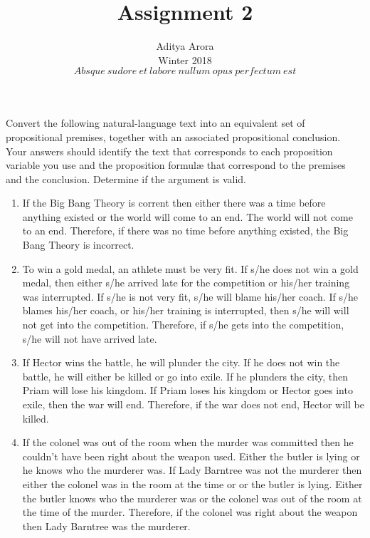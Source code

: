 \documentclass[12pt]{article}
\newenvironment{problem}[2][Problem]{\begin{trivlist}
\item[\hskip \labelsep {\bfseries #1}\hskip \labelsep {\bfseries #2.}]}{\end{trivlist}}
\begin{document}

\title{Assignment 2}%
\author{Aditya Arora\\ %
Winter 2018\\$Absque\ sudore\ et\ labore\ nullum\ opus\ perfectum\ est$} %
\maketitle

\begin{problem}{1}
Convert the following natural-language text into an equivalent set of propositional premises, together with an associated propositional conclusion.  Your answers should identify the text that corresponds to each proposition variable you use and the proposition formul{\ae} that correspond to the premises and the conclusion.  Determine if the argument is valid.
\begin{enumerate}
  \parskip=0in
  \parsep=0in
  \itemsep=0in
\item If the Big Bang Theory is corrent then either there was a time before anything existed or the world will come to an end.  The world will not come to an end.  Therefore, if there was no time before anything existed, the Big Bang Theory is incorrect.
\item To win a gold medal, an athlete must be very fit.  If s/he does not win a gold medal, then either s/he arrived late for the competition or his/her training was interrupted.  If s/he is not very fit, s/he will blame his/her coach.  If s/he blames his/her coach, or his/her training is interrupted, then s/he will will not get into the competition.  Therefore, if s/he gets into the competition, s/he will not have arrived late.
\item If Hector wins the battle, he will plunder the city.  If he does not win the battle, he will either be killed or go into exile.  If he plunders the city, then Priam will lose his kingdom.  If Priam loses his kingdom or Hector goes into exile, then the war will end.  Therefore, if the war does not end, Hector will be killed.
\item If the colonel was out of the room when the murder was committed then he couldn't have been right about the weapon used.  Either the butler is lying or he knows who the murderer was.  If Lady Barntree was not the murderer then either the colonel was in the room at the time or or the butler is lying.  Either the butler knows who the murderer was or the colonel was out of the room at the time of the murder.  Therefore, if the colonel was right about the weapon then Lady Barntree was the murderer.
\end{enumerate}
\end{problem}
\end{document}
